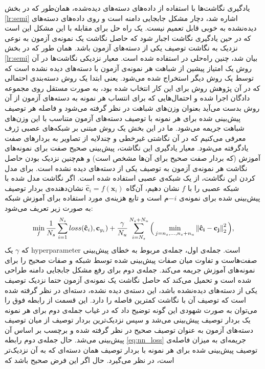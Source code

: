 یادگیری نگاشت‌ها با استفاده از داده‌های دسته‌های دیده‌شده، همان‌طور که در بخش \ref{lr:semi} اشاره شد، دچار مشکل جابجایی دامنه است و  روی داده‌های دسته‌های دیده‌نشده به خوبی قابل تعمیم نیست. یک راه حل برای مقابله با این مشکل این است که در حین یادگیری نگاشت اجبار شود که حاصل نگاشت یک نمونه‌ی آزمون به نوعی نزدیک به نگاشت توصیف یکی از دسته‌های آزمون باشد. همان ‌طور که در بخش
\ref{lr:semi}
بیان شد، چنین راه‌حلی در
\cite{Kodirov2015}
استفاده شده است. معیار نزدیکی نگاشت‌ها در آن روش یک امتیاز پیشین از شباهت هر نمونه‌ی آزمون با دسته‌های دیده نشده است که  توسط یک روش دیگر استخراج شده می‌شود. یعنی ابتدا یک روش دسته‌بندی
احتمالی  که در آن پژوهش روش  \cite{lampert09} برای این کار انتخاب شده بود، به صورت مستقل روی مجموعه دادگان اجرا شده و احتمال‌هایی که برای انتساب هر نمونه به دسته‌های آزمون از آن روش بدست می‌آید بعنوان وزن‌های شباهت در نظر گرفته می‌شود و فاصله هر توصیف پیش‌بینی شده برای هر نمونه با توصیف دسته‌های آزمون متناسب با این وزن‌های شباهت جریمه می‌شود.
 ما در این بخش یک روش مبتنی بر شبکه‌های عصبی ژرف معرفی می‌کنیم که در آن نگاشتی غیرخطی و چندلایه از تصاویر به بردارهای صفت یادگرفته می‌شود. معیار یادگیری این نگاشت، پیش‌بینی صحیح صفت برای نمونه‌های آموزش (که بردار صفت صحیح برای آن‌ها مشخص است) و هم‌چنین نزدیک بودن حاصل نگاشت هر نمونه‌ی آزمون به توصیف یکی از دسته‌های دیده نشده است. برای مدل کردن این نگاشت، از یک شبکه‌ی عصبی استفاده شده است. اگر نگاشت مدل شده با شبکه عصبی را با $f$ نشان دهیم، آن‌گاه
 $\mathbf{\hat{c}}_i = f (\mathbf{x}_i) $
 نشان‌دهنده‌ی بردار توصیف پیش‌بینی شده برای نمونه‌ی $-i$م است و
  تابع هزینه‌ی مورد استفاده برای آموزش شبکه به صورت زیر تعریف می‌شود:
\begin{equation}
\label{eq:nn_loss}
\min_{f}
\frac{1}{N_s} \sum_{i=1}^{N_s} loss(\mathbf{\hat{c}}_i), \mathbf{c}_{y_i}) +
\frac{\gamma}{N_u} \sum_{i=N_s}^{N_s+N_u} \Big ( \min_{j=n_s,\ldots,n_s + n_u} \left \lVert \mathbf{\hat{c}_i - c_j} \right \rVert_2^2 \Big ),
\end{equation}
که $\gamma$ یک \gls{hyperparameter} است.
جمله‌ی اول، جمله‌ی مربوط به خطای پیش‌بینی صفت‌هاست و تفاوت میان صفات پیش‌بینی شده توسط شبکه و صفات صحیح را برای نمونه‌های آموزش جریمه می‌کند.
 جمله‌ی دوم برای رفع مشکل جابجایی دامنه طراحی شده است و تحمیل می‌کند که حاصل نگاشت یک نمونه‌ی آزمون حتما نزدیک توصیف یکی از دسته‌های دیده‌نشده باشد، این دسته‌ی دیده نشده، دسته‌ای در نظر گرفته شده است که توصیف آن با نگاشت کمترین فاصله را دارد. این قسمت از رابطه فوق را می‌توان به صورت شهودی این گونه توضیح داد که در غیاب جمله‌ی دوم برای هر نمونه یک بردار توصیف پیش‌بینی می‌شد و سپس نزدیک‌ترین بردار توصیف از میان توصیف دسته‌های آزمون به عنوان توصیف صحیح در نظر گرفته شده و برچسب بر اساس آن پیش‌بینی می‌شد. حال جمله‌ی دوم رابطه \eqref{eq:nn_loss} جریمه‌ای به میزان فاصله‌ی توصیف پیش‌بینی شده برای هر نمونه با بردار توصیف همان دسته‌ای که به آن نزدیک‌تر است، در نظر می‌گیرد. حال اگر این فرض صحیح باشد که
